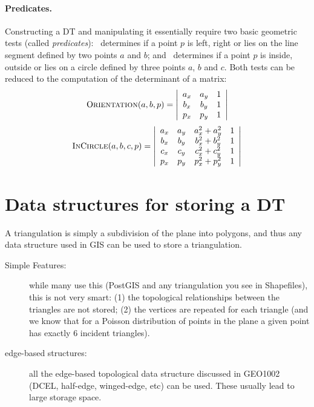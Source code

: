 \paragraph{Predicates.}
Constructing a DT and manipulating it essentially require two basic geometric tests (called \emph{predicates}): \Orient\ determines if a point $p$ is left, right or lies on the line segment defined by two points $a$ and $b$; and \Incircle\ determines if a point $p$ is inside, outside or lies on a circle defined by three points $a$, $b$ and $c$. 
Both tests can be reduced to the computation of the determinant of a matrix:
\begin{equation}
  \textrm{O}\textsc{rientation}(a, b, p) = 
  \left| 
  \begin{array}{cccc}
    a_{x} & a_{y} & 1 \\
    b_{x} & b_{y} & 1 \\
    p_{x} & p_{y} & 1 
  \end{array} 
  \right| 
\end{equation}
\begin{equation}
  \textrm{I}\textsc{n}\textrm{C}\textsc{ircle}(a, b, c, p) = 
  \left| 
  \begin{array}{ccccc}
    a_{x} & a_{y} & a^{2}_{x} + a^{2}_{y} & 1 \\
    b_{x} & b_{y} & b^{2}_{x} + b^{2}_{y} & 1 \\
    c_{x} & c_{y} & c^{2}_{x} + c^{2}_{y} & 1 \\
    p_{x} & p_{y} & p^{2}_{x} + p^{2}_{y} & 1 
  \end{array} 
  \right|
\label{eq:insphere}
\end{equation}


\section{Data structures for storing a DT}

A triangulation is simply a subdivision of the plane into polygons, and thus any data structure used in GIS can be used to store a triangulation.

\begin{description}
  \item[Simple Features:] while many use this (PostGIS and any triangulation you see in Shapefiles), this is not very smart: (1) the topological relationships between the triangles are not stored; (2) the vertices are repeated for each triangle (and we know that for a Poisson distribution of points in the plane a given point has exactly 6 incident triangles).
  \item[edge-based structures:] all the edge-based topological data structure discussed in GEO1002 (DCEL, half-edge, winged-edge, etc) can be used. These usually lead to large storage space.
\end{description}

